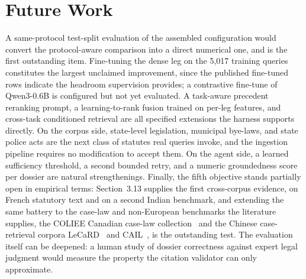 \documentclass{mnnit}
\begin{document}
\section{Future Work}
A same-protocol test-split evaluation of the assembled
configuration would convert the protocol-aware comparison into a
direct numerical one, and is the first outstanding item.
Fine-tuning the dense leg on the 5,017 training queries
constitutes the largest unclaimed improvement, since the
published fine-tuned rows indicate the headroom supervision
provides; a contrastive fine-tune of Qwen3-0.6B is configured but
not yet evaluated. A task-aware precedent reranking prompt, a
learning-to-rank fusion trained on per-leg features, and
cross-task conditioned retrieval are all specified extensions the
harness supports directly. On the corpus side, state-level
legislation, municipal bye-laws, and state police acts are the
next class of statutes real queries invoke, and the ingestion
pipeline requires no modification to accept them. On the agent
side, a learned sufficiency threshold, a second bounded retry,
and a numeric groundedness score per dossier are natural
strengthenings. Finally, the fifth objective stands partially
open in empirical terms: Section~3.13 supplies the first
cross-corpus evidence, on French statutory text and on a second
Indian benchmark, and extending
the same battery to the case-law and non-European benchmarks the
literature supplies, the COLIEE Canadian case-law
collection~\cite{rabelo2022coliee21} and the Chinese
case-retrieval corpora LeCaRD~\cite{ma2021lecard} and
CAIL~\cite{xiao2018cail2018}, is the outstanding test. The
evaluation itself can be
deepened: a human study of dossier correctness against expert
legal judgment would measure the property the citation validator
can only approximate.



\end{document}
